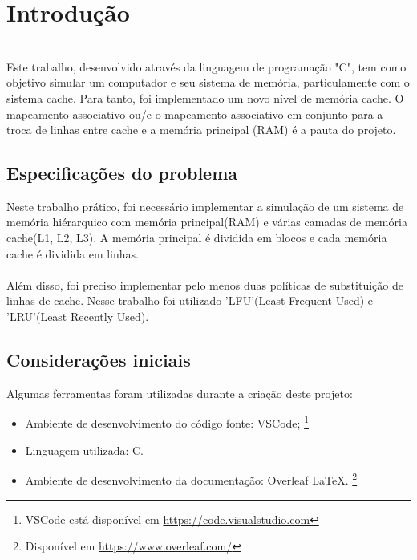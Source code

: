 \documentclass{article}
\begin{document}


\section{Introdução}
\\

Este trabalho, desenvolvido através da linguagem de programação "C", tem como objetivo simular um computador e seu sistema de memória, particulamente com o sistema cache. Para tanto, foi implementado um novo 
 nível de memória cache. O mapeamento associativo ou/e o mapeamento associativo em conjunto para a troca de linhas entre cache e a memória principal (RAM) é a pauta do projeto. 

\subsection{Especificações do problema}

Neste trabalho prático, foi necessário implementar a simulação de um sistema de memória hiérarquico com memória principal(RAM) e várias camadas de memória cache(L1, L2, L3). A memória principal é dividida em blocos e cada memória cache é dividida em linhas.
\\ \\
Além disso, foi preciso implementar pelo menos duas políticas de substituição de linhas de cache. Nesse trabalho foi utilizado 'LFU'(Least Frequent Used) e 'LRU'(Least Recently Used). 

\subsection{Considerações iniciais}

Algumas ferramentas foram utilizadas durante a criação deste projeto:

\begin{itemize}
  \item Ambiente de desenvolvimento do código fonte: VSCode; \footnote{VSCode está disponível em \url{https://code.visualstudio.com}}
  \item Linguagem utilizada: C.
  \item Ambiente de desenvolvimento da documentação: Overleaf \LaTeX. \footnote{Disponível em \url{https://www.overleaf.com/}}
\end{itemize}
\end{document}
